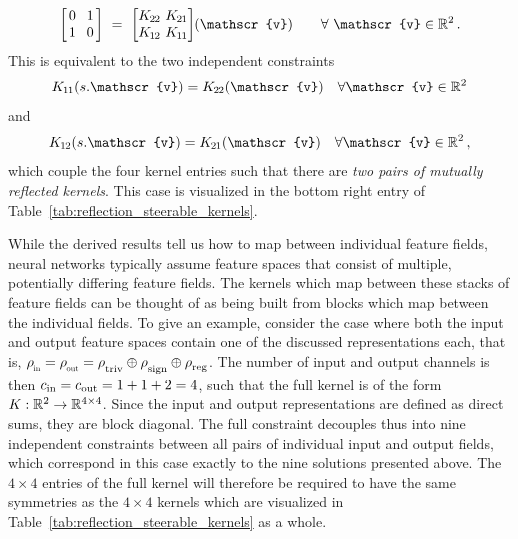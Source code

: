 \begin{itemize}
\begin{align}
                \begin{bmatrix} \hspace{1.5pt} 0 &\mkern-4mu 1 \hspace*{1.5pt} \\ \hspace{1.5pt} 1 &\mkern-4mu 0 \hspace*{1.5pt} \end{bmatrix}
            \ =\ 
                \begin{bmatrix} \Ktt &\mkern-12mu \Kto \\ \Kot &\mkern-12mu \Koo \end{bmatrix} \mkern-4mu (\mathscr{v})
            \qquad \forall\ \mathscr{v} \in \R^2 \,.
        \end{align}
        This is equivalent to the two independent constraints
        \begin{align}
            \Koo(s.\mathscr{v}) = \Ktt(\mathscr{v}) \quad \forall \mathscr{v} \in \R^2
        \end{align}
        and
        \begin{align}
            \Kot(s.\mathscr{v}) = \Kto(\mathscr{v}) \quad \forall \mathscr{v} \in \R^2 \,,
        \end{align}
        which couple the four kernel entries such that there are \emph{two pairs of mutually reflected kernels}.
        This case is visualized in the bottom right entry of Table~\ref{tab:reflection_steerable_kernels}.
\end{itemize}

While the derived results tell us how to map between individual feature fields, neural networks typically assume feature spaces that consist of multiple, potentially differing feature fields.
The kernels which map between these stacks of feature fields can be thought of as being built from blocks which map between the individual fields.
To give an example, consider the case where both the input and output feature spaces contain one of the discussed representations each, that is, $\rhoin = \rhoout = \rhotriv \oplus \rhosign \oplus \rhoreg$.
The number of input and output channels is then ${c_\textup{in}}={c_\textup{out}}=1+1+2=4$, such that the full kernel is of the form $K: \mathbb{R}^2 \to \mathbb{R}^{4\times4}$.
Since the input and output representations are defined as direct sums, they are block diagonal.
The full constraint decouples thus into nine independent constraints between all pairs of individual input and output fields, which correspond in this case exactly to the nine solutions presented above.
The $4\times4$ entries of the full kernel will therefore be required to have the same symmetries as the $4\times4$ kernels which are visualized in Table~\ref{tab:reflection_steerable_kernels} as a whole.

